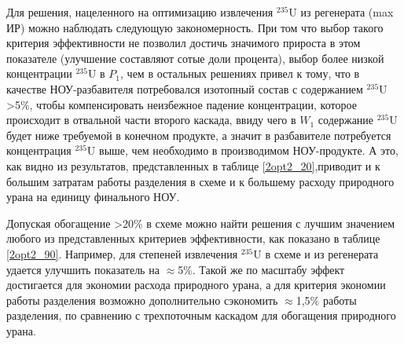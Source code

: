 Для решения, нацеленного на оптимизацию извлечения $^{235}$U из регенерата (max ИР) можно наблюдать следующую закономерность. При том что выбор такого критерия эффективности не позволил достичь значимого прироста в этом показателе (улучшение составляют сотые доли процента), выбор более низкой концентрации $^{235}$U в $P_{1}$, чем в остальных решениях привел к тому, что в качестве НОУ-разбавителя потребовался изотопный состав с содержанием $^{235}$U >5\%, чтобы компенсировать неизбежное падение концентрации, которое происходит в отвальной части второго каскада, ввиду чего в $W_{1}$ содержание $^{235}$U будет ниже требуемой в конечном продукте, а значит в разбавителе потребуется концентрация $^{235}$U выше, чем необходимо в производимом НОУ-продукте. А это, как видно из результатов, представленных в таблице \ref{2opt2_20},приводит и к большим затратам работы разделения в схеме и к большему расходу природного урана на единицу финального НОУ. 

Допуская обогащение >20\% в схеме можно найти решения с лучшим значением любого из представленных критериев эффективности, как показано в таблице \ref{2opt2_90}. Например, для степеней извлечения $^{235}$U в схеме и из регенерата удается улучшить показатель на $\approx$5\%. Такой же по масштабу эффект достигается для экономии расхода природного урана, а для критерия экономии работы разделения возможно дополнительно сэкономить $\approx$1,5\% работы разделения, по сравнению с трехпоточным каскадом для обогащения природного урана.

